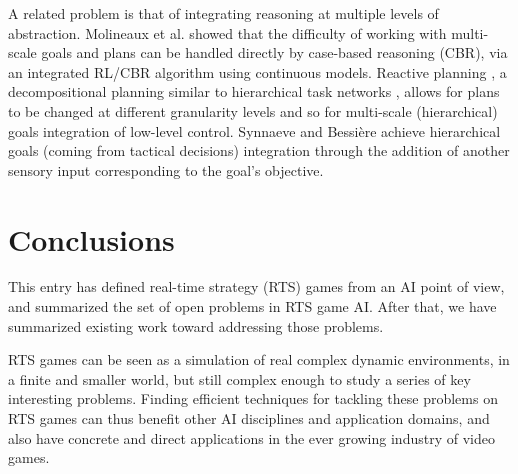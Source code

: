 \documentclass{llncs}
\begin{document}
A related problem is that  of integrating reasoning at multiple levels
of abstraction.  Molineaux et  al. \cite{Molineaux08} showed  that the
difficulty of working with multi-scale  goals and plans can be handled
directly  by  case-based reasoning  (CBR),  via  an integrated  RL/CBR
algorithm     using    continuous     models.    Reactive     planning
\cite{WeberCig10}, a decompositional  planning similar to hierarchical
task networks  \cite{HTNPlanning}, allows for  plans to be  changed at
different  granularity levels  and so  for multi-scale  (hierarchical)
goals  integration of  low-level  control.  Synnaeve and  Bessi\`{e}re
\cite{SynnaeveMicroCig11}  achieve  hierarchical  goals  (coming  from
tactical  decisions)  integration  through  the  addition  of  another
sensory input corresponding to the goal's objective.


\section{Conclusions}

This entry has defined real-time strategy (RTS) games from an AI point of view, and summarized the set of open problems in RTS game AI. After that, we have summarized existing work toward addressing those problems.

RTS games can be seen as a simulation of real complex dynamic environments, in a finite and smaller world, but still complex enough to study a series of key interesting problems. Finding efficient techniques for tackling these problems on RTS games can thus benefit other  AI disciplines and  application domains, and  also have concrete and direct applications in the ever growing industry of video games.





\end{document}
